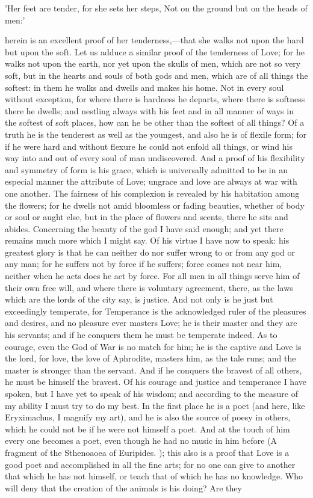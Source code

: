 \documentclass[11pt,letter]{article}
\begin{document}
\par  'Her feet are tender, for she sets her steps, Not on the ground but on the heads of men:'

\par  herein is an excellent proof of her tenderness,—that she walks not upon the hard but upon the soft. Let us adduce a similar proof of the tenderness of Love; for he walks not upon the earth, nor yet upon the skulls of men, which are not so very soft, but in the hearts and souls of both gods and men, which are of all things the softest: in them he walks and dwells and makes his home. Not in every soul without exception, for where there is hardness he departs, where there is softness there he dwells; and nestling always with his feet and in all manner of ways in the softest of soft places, how can he be other than the softest of all things? Of a truth he is the tenderest as well as the youngest, and also he is of flexile form; for if he were hard and without flexure he could not enfold all things, or wind his way into and out of every soul of man undiscovered. And a proof of his flexibility and symmetry of form is his grace, which is universally admitted to be in an especial manner the attribute of Love; ungrace and love are always at war with one another. The fairness of his complexion is revealed by his habitation among the flowers; for he dwells not amid bloomless or fading beauties, whether of body or soul or aught else, but in the place of flowers and scents, there he sits and abides. Concerning the beauty of the god I have said enough; and yet there remains much more which I might say. Of his virtue I have now to speak: his greatest glory is that he can neither do nor suffer wrong to or from any god or any man; for he suffers not by force if he suffers; force comes not near him, neither when he acts does he act by force. For all men in all things serve him of their own free will, and where there is voluntary agreement, there, as the laws which are the lords of the city say, is justice. And not only is he just but exceedingly temperate, for Temperance is the acknowledged ruler of the pleasures and desires, and no pleasure ever masters Love; he is their master and they are his servants; and if he conquers them he must be temperate indeed. As to courage, even the God of War is no match for him; he is the captive and Love is the lord, for love, the love of Aphrodite, masters him, as the tale runs; and the master is stronger than the servant. And if he conquers the bravest of all others, he must be himself the bravest. Of his courage and justice and temperance I have spoken, but I have yet to speak of his wisdom; and according to the measure of my ability I must try to do my best. In the first place he is a poet (and here, like Eryximachus, I magnify my art), and he is also the source of poesy in others, which he could not be if he were not himself a poet. And at the touch of him every one becomes a poet, even though he had no music in him before (A fragment of the Sthenoaoea of Euripides. ); this also is a proof that Love is a good poet and accomplished in all the fine arts; for no one can give to another that which he has not himself, or teach that of which he has no knowledge. Who will deny that the creation of the animals is his doing? Are they 
\end{document}
